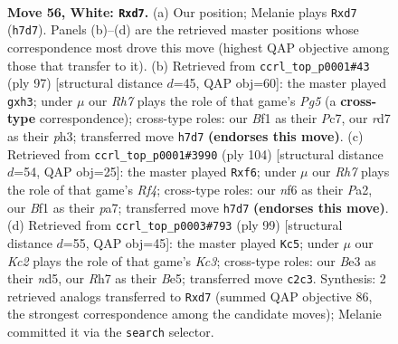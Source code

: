 \documentclass[11pt]{article}
\begin{document}
\clearpage

\begin{figure}[p]\centering
\begin{subfigure}{0.46\textwidth}\centering
\resizebox{\linewidth}{!}{%
\newchessgame
\chessboard[
  setfen={8/p1pr3R/4knR1/5p2/r4P2/4B3/2K4P/5B2 w - - 16 56},
  showmover=false,
  pgfstyle=straightmove, color=movearrow, markmove={h7-d7}
]}
\caption{}
\end{subfigure}\hfill
\begin{subfigure}{0.46\textwidth}\centering
\resizebox{\linewidth}{!}{%
\newchessgame
\chessboard[
  setfen={5k2/2pb1p2/8/8/4nPp1/rN2R2P/7K/2R5 b - - 4 49},
  showmover=false,
  pgfstyle=straightmove, color=movearrow, markmove={g4-h3}
]}
\caption{}
\end{subfigure}
\\[4pt]
\begin{subfigure}{0.46\textwidth}\centering
\resizebox{\linewidth}{!}{%
\newchessgame
\chessboard[
  setfen={8/p1R2pk1/5r2/8/5RP1/r7/P3P1K1/8 w - - 5 53},
  showmover=false,
  pgfstyle=straightmove, color=movearrow, markmove={f4-f6}
]}
\caption{}
\end{subfigure}\hfill
\begin{subfigure}{0.46\textwidth}\centering
\resizebox{\linewidth}{!}{%
\newchessgame
\chessboard[
  setfen={6r1/5r2/1pkp4/3Nb3/2P1RP1p/5K1P/8/3R4 b - - 1 50},
  showmover=false,
  pgfstyle=straightmove, color=movearrow, markmove={c6-c5}
]}
\caption{}
\end{subfigure}
\caption{\textbf{Move 56, White: \texttt{Rxd7}.} (a) Our position; Melanie plays \texttt{Rxd7} (\texttt{h7d7}). Panels (b)--(d) are the retrieved master positions whose correspondence most drove this move (highest QAP objective among those that transfer to it). (b) Retrieved from \texttt{ccrl\_top\_p0001\#43} (ply 97) [structural distance $d$=45, QAP obj=60]: the master played \texttt{gxh3}; under $\mu$ our \emph{Rh7} plays the role of that game's \emph{Pg5} (a \textbf{cross-type} correspondence); cross-type roles: our \emph{B}f1 as their \emph{P}c7, our \emph{r}d7 as their \emph{p}h3; transferred move \texttt{h7d7} \textbf{(endorses this move)}. (c) Retrieved from \texttt{ccrl\_top\_p0001\#3990} (ply 104) [structural distance $d$=54, QAP obj=25]: the master played \texttt{Rxf6}; under $\mu$ our \emph{Rh7} plays the role of that game's \emph{Rf4}; cross-type roles: our \emph{n}f6 as their \emph{P}a2, our \emph{B}f1 as their \emph{p}a7; transferred move \texttt{h7d7} \textbf{(endorses this move)}. (d) Retrieved from \texttt{ccrl\_top\_p0003\#793} (ply 99) [structural distance $d$=55, QAP obj=45]: the master played \texttt{Kc5}; under $\mu$ our \emph{Kc2} plays the role of that game's \emph{Kc3}; cross-type roles: our \emph{B}e3 as their \emph{n}d5, our \emph{R}h7 as their \emph{B}e5; transferred move \texttt{c2c3}. Synthesis: 2 retrieved analogs transferred to \texttt{Rxd7} (summed QAP objective 86, the strongest correspondence among the candidate moves); Melanie committed it via the \texttt{search} selector.}
\label{fig:thought-m110}
\end{figure}
\end{document}
